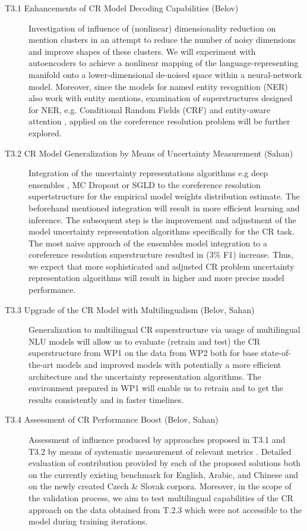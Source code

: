 \begin{description}
	\item [T3.1 Enhancements of CR Model Decoding Capabilities (Belov)] Investigation of influence of (nonlinear) dimensionality reduction on mention clusters in an attempt to reduce the number of noisy dimensions and improve shapes of these clusters. We will experiment with autoencoders \cite{autoencoders-Zabalza2016,autoencoders-Sahay2019} to achieve a nonlinear mapping of the language-representing manifold onto a lower-dimensional de-noised space within a neural-network model. Moreover, since the models for named entity recognition (NER) also work with entity mentions, examination of superstructures designed for NER, e.g. Conditional Random Fields (CRF) \cite{ner-Strakova2019,ner-Zhanming2019} and entity-aware attention \cite{ner-Yamada2020}, applied on the coreference resolution problem will be further explored.

	\item [T3.2 CR Model Generalization by Means of Uncertainty Measurement (Sahan)] Integration of the uncertainty representations algorithms e.g deep ensembles \cite{lakshminarayanan2016simple}, MC Dropout \cite{gal2017deep} or SGLD \cite{welling2011bayesian} to the coreference resolution supertstructure for the empirical model weights distribution estimate. The beforehand mentioned integration will result in more efficient learning and inference. The subsequent step is the improvement and adjustment of the model uncertainty representation algorithms specifically for the CR task. The most naive approach of the ensembles model integration to a coreference resolution superstructure \cite{cr-Lee17} resulted in (3\% F1) increase. Thus, we expect that more sophisticated and adjusted CR problem uncertainty representation algorithms will result in higher and more precise model performance.

	\item [T3.3 Upgrade of the CR Model with Multilingualism (Belov, Sahan)] Generalization to multilingual CR superstructure via usage of multilingual NLU models will allow us to evaluate (retrain and test) the CR superstructure from WP1 on the data from WP2 both for base state-of-the-art models and improved models with potentially a more efficient architecture and the uncertainty representation algorithms. The environment prepared in WP1 will enable us to retrain and to get the results consistently and in faster timelines. 


	\item  [T3.4 Assessment of CR Performance Boost (Belov, Sahan)]  Assessment of influence produced by approaches proposed in T3.1 and T3.2 by means of systematic measurement of relevant metrics \cite{muc-Vilain1995,b3-Bagga1998,ceaf-Luo2005}. Detailed evaluation of contribution provided by each of the proposed solutions both on the currently existing benchmark for English, Arabic, and Chinese \cite{ontonotes5-Weischedel2013} and on the newly created Czech \& Slovak corpora. Moreover, in the scope of the validation process, we aim to test multilingual capabilities of the CR approach on the data obtained from T.2.3 which were not accessible to the model during training iterations.
	

\end{description}

